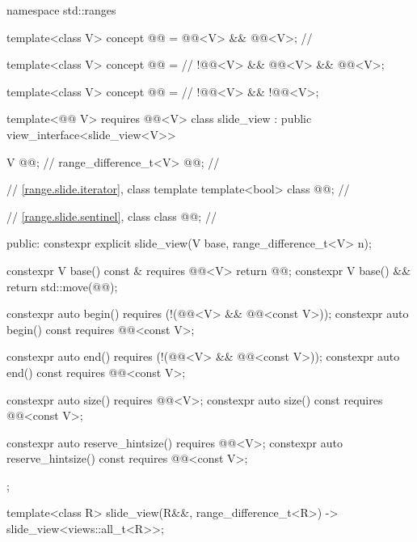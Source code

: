 \begin{codeblock}
namespace std::ranges {
  template<class V>
  concept @@ = @@<V> && @@<V>;       // \expos

  template<class V>
  concept @@ =                                            // \expos
    !@@<V> && @@<V> && @@<V>;

  template<class V>
  concept @@ =                                           // \expos
    !@@<V> && !@@<V>;

  template<@@ V>
    requires @@<V>
  class slide_view : public view_interface<slide_view<V>> {
    V @@;                            // \expos
    range_difference_t<V> @@;           // \expos

    // \ref{range.slide.iterator}, class template 
    template<bool> class @@;      // \expos

    // \ref{range.slide.sentinel}, class 
    class @@;                     // \expos

  public:
    constexpr explicit slide_view(V base, range_difference_t<V> n);

    constexpr V base() const & requires @@<V> { return @@; }
    constexpr V base() && { return std::move(@@); }

    constexpr auto begin()
      requires (!(@@<V> && @@<const V>));
    constexpr auto begin() const requires @@<const V>;

    constexpr auto end()
      requires (!(@@<V> && @@<const V>));
    constexpr auto end() const requires @@<const V>;

    constexpr auto size() requires @@<V>;
    constexpr auto size() const requires @@<const V>;

    constexpr auto reserve_hintsize() requires @@<V>;
    constexpr auto reserve_hintsize() const requires @@<const V>;
  };

  template<class R>
    slide_view(R&&, range_difference_t<R>) -> slide_view<views::all_t<R>>;
}
\end{codeblock}

